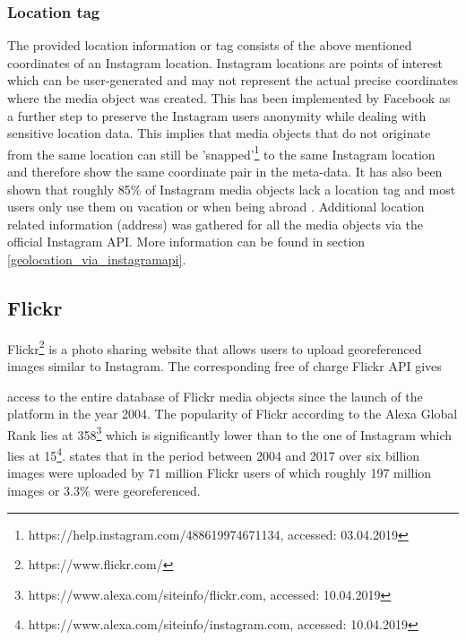 \subsubsection{Location tag} \label{instagram_location_tag}
The provided location information or tag consists of the above mentioned coordinates of an Instagram location. Instagram locations are points of interest which can be user-generated and may not represent the actual precise coordinates where the media object was created. This has been implemented by Facebook as a further step to preserve the Instagram users anonymity while dealing with sensitive location data. This implies that media objects that do not originate from the same location can still be 'snapped'\footnote{https://help.instagram.com/488619974671134, accessed: 03.04.2019} to the same Instagram location and therefore show the same coordinate pair in the meta-data.
It has also been shown that roughly 85\% of Instagram media objects lack a location tag and most users only use them on vacation or when being abroad \parencite{Flatow2015}.
Additional location related information (address) was gathered for all the media objects via the official Instagram API. More information can be found in section \ref{geolocation_via_instagramapi}.



\subsection{Flickr} \label{flickr}
Flickr\footnote{https://www.flickr.com/} is a photo sharing website that allows users to upload georeferenced images similar to Instagram. The corresponding free of charge Flickr API gives

\renewcommand{\thefootnote}{\alph{footnote}}

access to the entire database of Flickr media objects since the launch of the platform in the year 2004. The popularity of Flickr according to the Alexa Global Rank lies at 358\footnote{https://www.alexa.com/siteinfo/flickr.com, accessed: 10.04.2019} which is significantly lower than to the one of Instagram which lies at 15\footnote{https://www.alexa.com/siteinfo/instagram.com, accessed: 10.04.2019}. \textcite{Tenkanen2017} states that in the period between 2004 and 2017 over six billion images were uploaded by 71 million Flickr users of which roughly 197 million images or 3.3\% were georeferenced. 

\renewcommand{\thefootnote}{\arabic{footnote}}

